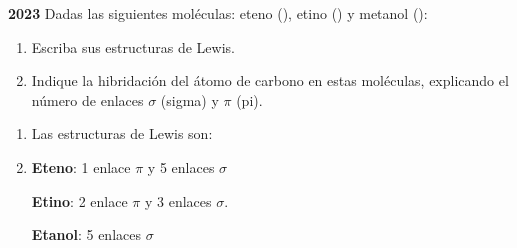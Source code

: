 \begin{exerciseEVAU}
    \textbf{2023} Dadas las siguientes moléculas: eteno (), etino () y metanol ():
    \begin{enumerate}[label=\letraminuscula]
        \item Escriba sus estructuras de Lewis.
        \item Indique la hibridación del átomo de carbono en estas moléculas, explicando el número de enlaces \( \sigma \) (sigma) y \( \pi \) (pi).
    \end{enumerate}

    \begin{solu}
        \begin{enumerate}[label=\letraminuscula]
            \item Las estructuras de Lewis son:

            \begin{center}
                \hspace{1.5cm}
                \hspace{1.5cm}
            \end{center}
            \item \textbf{Eteno}: 1 enlace \( \pi \) y 5 enlaces \( \sigma \)

            \textbf{Etino}: 2 enlace \( \pi \) y 3 enlaces \( \sigma \).

            \textbf{Etanol}: 5 enlaces \( \sigma \)
        \end{enumerate}
    \end{solu}
\end{exerciseEVAU}

